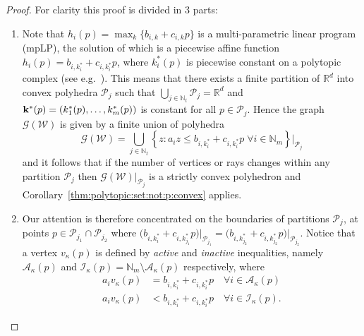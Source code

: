 \documentclass[journal]{IEEEtran}
\theoremstyle{remark}
\theoremstyle{definition}
\begin{document}
\begin{proof}
For clarity this proof is divided in 3 parts:
\begin{enumerate}
\item Note that $h_i(p) = \max_{k} \{b_{i,k} + c_{i,k}p\}$ is a multi-parametric linear program (mpLP),
the solution of which is a piecewise affine function $h_i(p) = b_{i,k^\ast_i} + c_{i,k^\ast_i}p$, where $k^\ast_i(p)$ is piecewise constant on a polytopic complex (see e.g.~\cite{spjotvold:2005}).
%
This means that there exists a finite partition 
of $\mathbb R^d$ 
into convex polyhedra 
$\mathcal P_j$ such that $\bigcup_{j\in\mathbb N_t} \mathcal P_j = \mathbb R^d$ and 
${\bf{k}}^\ast(p) = (k_1^\ast(p),\dots,k_m^\ast(p))$ is constant for all $p \in \mathcal P_j$.
%
%
Hence the graph $\mathscr G(\mathcal W)$ is given by a finite union of polyhedra
%
\begin{equation*}
  \mathscr G(\mathcal W) = \bigcup_{j\in\mathbb N_t} \left\{z: a_i z \leq b_{i,k_i^\ast} + c_{i,k_i^\ast}p \; \forall i \in\mathbb N_m \right\}\bigr\vert_{\mathcal P_{j}}
\end{equation*}
%
and it follows that if the number of vertices or rays changes within any partition $\mathcal P_j$ then $\mathscr
G(\mathcal W)\vert_{\mathcal P_j}$ is a strictly convex polyhedron and Corollary~\ref{thm:polytopic:set:not:p:convex} applies.
%
\item Our attention is therefore concentrated on the boundaries of partitions $\mathcal P_j$, at points $p\in\mathcal P_{j_1} \cap \mathcal P_{j_2}$ where 
$\bigl(b_{i,k_i^\ast} + c_{i,k_{j_1}^\ast} p\bigr)\bigr\rvert_{\mathcal P_{j_1}} = 
\bigl(b_{i,k_{j_2}^\ast} + c_{i,k_{j_2}^\ast} p\bigr)\bigr\rvert_{\mathcal P_{j_2}}$.
%
Notice that a vertex $v_\kappa(p)$ is defined by \emph{active} and \emph{inactive} inequalities, namely $\mathcal A_\kappa(p)$ and
$\mathcal I_\kappa(p) = \mathbb N_m
\setminus\mathcal A_\kappa(p)$ respectively, where
%
\begin{equation*}\begin{split}
  a_i v_\kappa(p) &= b_{i,k_i^\ast} + c_{i,k_i^\ast} p \quad\forall i\in\mathcal A_\kappa(p)\\
  a_i v_\kappa(p) &< b_{i,k_i^\ast} + c_{i,k_i^\ast} p \quad\forall i\in\mathcal I_\kappa(p) .
\end{split}\end{equation*}

\end{enumerate}
\end{proof}
\end{document}
